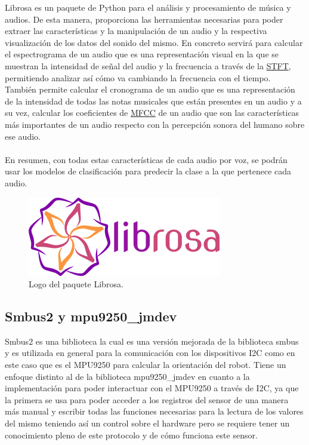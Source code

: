 Librosa es un paquete de Python para el análisis y procesamiento de música y audios. De esta manera, proporciona las herramientas necesarias para poder extraer las características y la manipulación de un audio y la respectiva visualización de los datos del sonido del mismo. En concreto servirá para calcular el espectrograma de un audio que es una representación visual en la que se muestran la intensidad de señal del audio y la frecuencia a través de la \hyperlink{STFT}{STFT}, permitiendo analizar así cómo va cambiando la frecuencia con el tiempo.\\

También permite calcular el cronograma de un audio que es una representación de la intensidad de todas las notas musicales que están presentes en un audio y a su vez, calcular los coeficientes de \hyperlink{MFCC}{MFCC} de un audio que son las características más importantes de un audio respecto con la percepción sonora del humano sobre ese audio.\\ \\

En resumen, con todas estas características de cada audio por voz, se podrán usar los modelos de clasificación para predecir la clase a la que pertenece cada audio. 

\begin{figure}[H]
  \centering
  \includegraphics[scale=0.4]{figs/librosa} %
  \caption{Logo del paquete Librosa.}
  \label{fig:librosa}
\end{figure}


\subsection{Smbus2 y mpu9250\_jmdev}
\label{subsec:smbus2mpu9250jmdev}


Smbus2 es una biblioteca la cual es una versión mejorada de la biblioteca smbus y es utilizada en general para la comunicación con los dispositivos I2C como en este caso que es el MPU9250 para calcular la orientación del robot. Tiene un enfoque distinto al de la biblioteca mpu9250\_jmdev en cuanto a la implementación para poder interactuar con el MPU9250 a través de I2C, ya que la primera se usa para poder acceder a los registros del sensor de una manera más manual y escribir todas las funciones necesarias para la lectura de los valores del mismo teniendo así un control sobre el hardware pero se requiere tener un conocimiento pleno de este protocolo y de cómo funciona este sensor.\\

